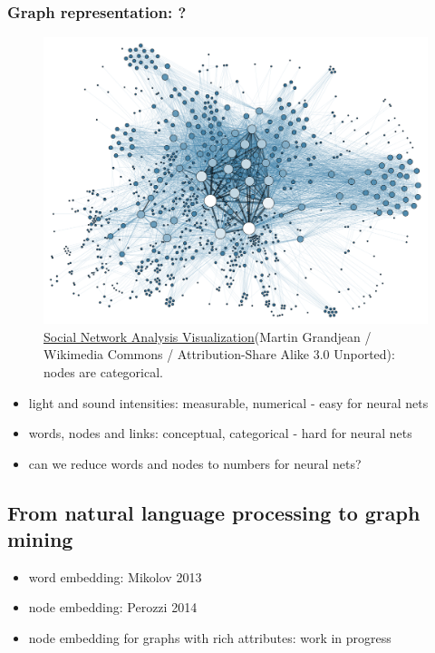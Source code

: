 \documentclass{article}
\begin{document}
\subsubsection{Graph representation: ?}
\begin{figure}[H]
	\centering
	\includegraphics[width=\linewidth]{Social_Network_Analysis_Visualization}
	\caption{ \href{https://commons.wikimedia.org/wiki/File:Social_Network_Analysis_Visualization.png}{Social Network Analysis Visualization}(Martin Grandjean / Wikimedia Commons / Attribution-Share Alike 3.0 Unported): nodes are categorical.}
	\label{fig:Social_Network_Analysis_Visualization}
\end{figure}
\begin{itemize}
	\item light and sound intensities: measurable, numerical - easy for neural nets
	\item words, nodes and links: conceptual, categorical - hard for neural nets
	\item can we reduce words and nodes to numbers for neural nets?
\end{itemize}

\subsection{From natural language processing to graph mining}
\begin{itemize}
	\item word embedding: Mikolov 2013
	\item node embedding: Perozzi 2014
	\item node embedding for graphs with rich attributes: work in progress
\end{itemize}
\end{document}
